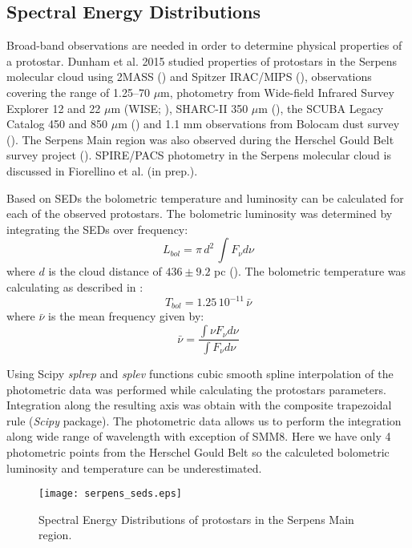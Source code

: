 \documentclass{aa}
\begin{document}
\begin{appendix} %
\section{Spectral Energy Distributions}

Broad-band observations are needed in order to determine physical properties of a protostar. Dunham et al. 2015 studied properties of protostars in the Serpens molecular cloud using 2MASS (\cite{Skr06}) and Spitzer IRAC/MIPS (\cite{Eva09}), observations covering the range of 1.25–70 $\mu$m, photometry from Wide-field Infrared Survey Explorer 12 and 22 $\mu$m (WISE; \cite{Wri10}), SHARC-II 350 $\mu$m (\cite{Sur16}), the SCUBA Legacy Catalog 450 and 850 $\mu$m (\cite{dFr08}) and 1.1 mm observations from Bolocam dust survey (\cite{Eno07}). The Serpens Main region was also observed during the Herschel Gould Belt survey project (\cite{And10}). SPIRE/PACS photometry in the Serpens molecular cloud is discussed in Fiorellino et al. (in prep.). 

Based on SEDs the bolometric temperature and luminosity can be calculated for each of the observed protostars. The bolometric luminosity was determined by integrating the SEDs over frequency:
\begin{equation} \label{eq1}
L_{bol} = \pi \, d^2 \, \int F_\nu d\nu
\end{equation}
where $d$ is the cloud distance of $436 \pm 9.2$ pc (\cite{Ort17}).
The bolometric temperature was calculating as described in \cite{Mye93}:
\begin{equation} \label{eq2}
T_{bol} = 1.25 \, 10^{-11} \, \bar{\nu}
\end{equation}
where $\bar{\nu}$ is the mean frequency given by:
\begin{equation} \label{eq3}
\bar{\nu} = \frac{\int \nu F_\nu d\nu}{ \int F_\nu d\nu}
\end{equation}

Using Scipy \textit{splrep} and \textit{splev} functions cubic smooth spline interpolation of the photometric data was performed while calculating the protostars parameters. Integration along the resulting axis was obtain with the composite trapezoidal rule (\textit{Scipy} package). The photometric data allows us to perform the integration along wide range of wavelength with exception of SMM8. Here we have only 4 photometric points from the Herschel Gould Belt so the calculeted bolometric luminosity and temperature can be underestimated.


\begin{figure}
   \texttt{[image: serpens\_seds.eps]}
      \caption{Spectral Energy Distributions of protostars in the Serpens Main region.}
         \label{seds}
   \end{figure}

\end{appendix}
\end{document}
